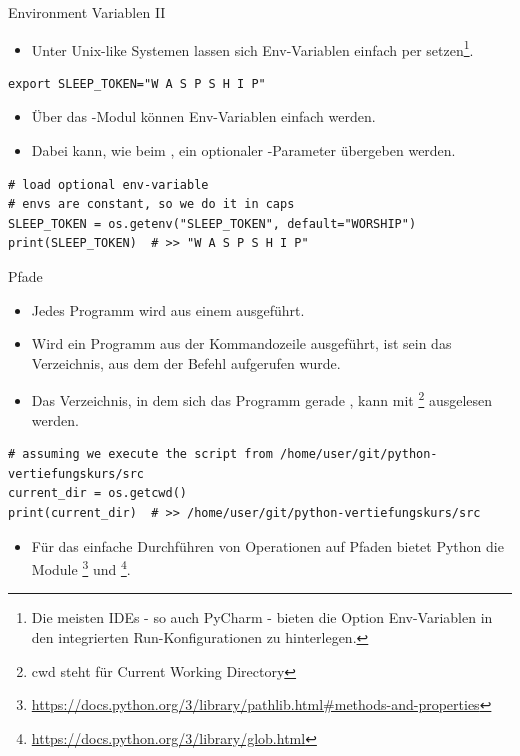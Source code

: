 \documentclass[12pt, aspectratio=169, usepdftitle=false]{beamer}
\newcommand{\pp}[1]{\lpl{#1}}
\newcommand{\furl}[1]{\footnote{\url{#1}}}
\begin{document}
\begin{frame}[fragile]{Environment Variablen II}
	\begin{itemize}
	\item Unter Unix-like Systemen lassen sich Env-Variablen einfach per  setzen\footnote{Die meisten IDEs - so auch PyCharm - bieten die Option Env-Variablen in den integrierten Run-Konfigurationen zu hinterlegen.}.
	\pause
	\end{itemize}
	\begin{lstlisting}[language=pytiny]
export SLEEP_TOKEN="W A S P S H I P" 
	\end{lstlisting}
	
	\pause
	
	\begin{itemize}
		\item Über das \pp{os}-Modul können Env-Variablen einfach  werden.
		\item Dabei kann, wie beim \pp{dict}, ein optionaler -Parameter übergeben werden.
	\end{itemize}
	
	\pause
	
	\begin{lstlisting}[language=pytiny]
# load optional env-variable
# envs are constant, so we do it in caps
SLEEP_TOKEN = os.getenv("SLEEP_TOKEN", default="WORSHIP")
print(SLEEP_TOKEN)  # >> "W A S P S H I P" 
	\end{lstlisting}
	
\end{frame}


\begin{frame}[fragile]{Pfade}
	\begin{itemize}
		\item Jedes Programm wird aus einem  ausgeführt.
		\item Wird ein Programm aus der Kommandozeile ausgeführt, ist sein  das Verzeichnis, aus dem der Befehl aufgerufen wurde.
		\pause
		\item Das Verzeichnis, in dem sich das Programm gerade , kann mit \pp{os.getcwd()}\footnote{cwd steht für Current Working Directory} ausgelesen werden.
	\end{itemize}
	\begin{lstlisting}[language=pytiny]
# assuming we execute the script from /home/user/git/python-vertiefungskurs/src
current_dir = os.getcwd()
print(current_dir)  # >> /home/user/git/python-vertiefungskurs/src
\end{lstlisting}
\begin{itemize}
	\item Für das einfache Durchführen von  Operationen auf Pfaden bietet Python die Module \pp{Pathlib}\furl{https://docs.python.org/3/library/pathlib.html\#methods-and-properties} und \pp{glob}\furl{https://docs.python.org/3/library/glob.html}.
\end{itemize}
	
\end{frame}
\end{document}
